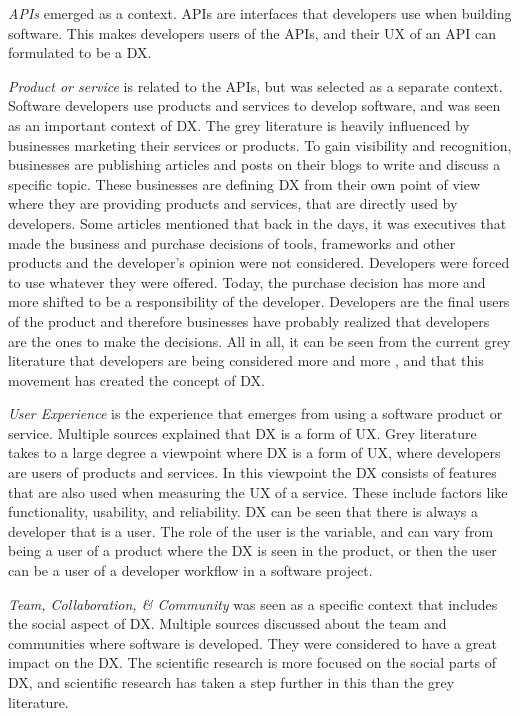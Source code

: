 \documentclass[english, 12pt, a4paper, sci, utf8, a-1b, online]{aaltothesis}
\begin{document}
\textit{APIs} emerged as a context. APIs are interfaces that developers use when building software. This makes developers users of the APIs, and their UX of an API can formulated to be a DX.

\textit{Product or service} is related to the APIs, but was selected as a separate context. Software developers use products and services to develop software, and was seen as an important context of DX. The grey literature is heavily influenced by businesses marketing their services or products. To gain visibility and recognition, businesses are publishing articles and posts on their blogs to write and discuss a specific topic. These businesses are defining DX from their own point of view where they are providing products and services, that are directly used by developers. Some articles mentioned that back in the days, it was executives that made the business and purchase decisions of tools, frameworks and other products and the developer's opinion were not considered. Developers were forced to use whatever they were offered. Today, the purchase decision has more and more shifted to be a responsibility of the developer. Developers are the final users of the product and therefore businesses have probably realized that developers are the ones to make the decisions. All in all, it can be seen from the current grey literature that developers are being considered more and more \parencite{dx-devs-are-people-too}, and that this movement has created the concept of DX.

\textit{User Experience} is the experience that emerges from using a software product or service. Multiple sources explained that DX is a form of UX. Grey literature takes to a large degree a viewpoint where DX is a form of UX, where developers are users of products and services. In this viewpoint the DX consists of features that are also used when measuring the UX of a service. These include factors like functionality, usability, and reliability. DX can be seen that there is always a developer that is a user. The role of the user is the variable, and can vary from being a user of a product where the DX is seen in the product, or then the user can be a user of a developer workflow in a software project.

\textit{Team, Collaboration, \& Community} was seen as a specific context that includes the social aspect of DX. Multiple sources discussed about the team and communities where software is developed. They were considered to have a great impact on the DX. The scientific research is more focused on the social parts of DX, and scientific research has taken a step further in this than the grey literature.
\end{document}
